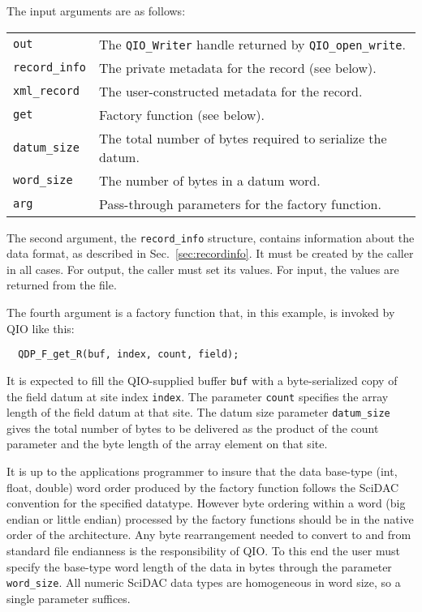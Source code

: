 \documentclass{article}
\begin{document}
The input arguments are as follows:
\begin{flushleft}
\begin{tabular}{ll}
 \verb|out| & The \verb|QIO_Writer| handle returned by \verb|QIO_open_write|. \\
 \verb|record_info| & The private metadata for the record (see below). \\
 \verb|xml_record|  & The user-constructed metadata for the record. \\
 \verb|get|         & Factory function (see below). \\
 \verb|datum_size|  & The total number of bytes required to serialize the datum. \\
 \verb|word_size|   & The number of bytes in a datum word. \\
 \verb|arg|         & Pass-through parameters for the factory function. \\
\end{tabular}
\end{flushleft}
%
The second argument, the \verb|record_info| structure, contains
information about the data format, as described in
Sec.~\ref{sec:recordinfo}.  It must be created by the caller in all
cases.  For output, the caller must set its values.  For input, the
values are returned from the file.

The fourth argument is a factory function that, in this example, is
invoked by QIO like this:
%
\begin{verbatim}
  QDP_F_get_R(buf, index, count, field);
\end{verbatim}
%
It is expected to fill the QIO-supplied buffer \verb|buf| with a
byte-serialized copy of the field datum at site index \verb|index|.
The parameter \verb|count| specifies the array length of the field
datum at that site.  The datum size parameter \verb|datum_size| gives
the total number of bytes to be delivered as the product of the count
parameter and the byte length of the array element on that site.

It is up to the applications programmer to insure that the data
base-type (int, float, double) word order produced by the factory
function follows the SciDAC convention for the specified datatype.
However byte ordering within a word (big endian or little endian)
processed by the factory functions should be in the native order of
the architecture.  Any byte rearrangement needed to convert to and
from standard file endianness is the responsibility of QIO.  To this
end the user must specify the base-type word length of the data in
bytes through the parameter \verb|word_size|.  All numeric SciDAC data
types are homogeneous in word size, so a single parameter
suffices.
\end{document}
